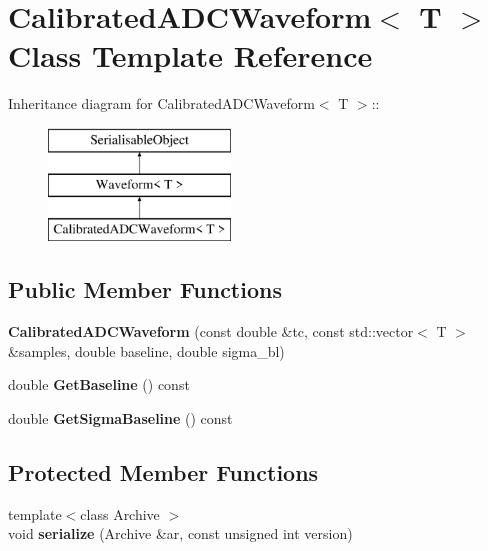 \hypertarget{classCalibratedADCWaveform}{
\section{CalibratedADCWaveform$<$ T $>$ Class Template Reference}
\label{classCalibratedADCWaveform}
}
Inheritance diagram for CalibratedADCWaveform$<$ T $>$::\begin{figure}[H]
\begin{center}
\leavevmode
\includegraphics[height=3cm]{classCalibratedADCWaveform}
\end{center}
\end{figure}
\subsection*{Public Member Functions}
\begin{DoxyCompactItemize}
\item 
\hypertarget{classCalibratedADCWaveform_ab8d6abbf935c75db5de184c5a3291ef6}{
{\bfseries CalibratedADCWaveform} (const double \&tc, const std::vector$<$ T $>$ \&samples, double baseline, double sigma\_\-bl)}
\label{classCalibratedADCWaveform_ab8d6abbf935c75db5de184c5a3291ef6}

\item 
\hypertarget{classCalibratedADCWaveform_ae22d006546a5666eafd89d361a470798}{
double {\bfseries GetBaseline} () const }
\label{classCalibratedADCWaveform_ae22d006546a5666eafd89d361a470798}

\item 
\hypertarget{classCalibratedADCWaveform_a5afc74fd628dd6d70d60378467092e9d}{
double {\bfseries GetSigmaBaseline} () const }
\label{classCalibratedADCWaveform_a5afc74fd628dd6d70d60378467092e9d}

\end{DoxyCompactItemize}
\subsection*{Protected Member Functions}
\begin{DoxyCompactItemize}
\item 
\hypertarget{classCalibratedADCWaveform_a79b70f364816b8e558ab18d279b6b806}{
{\footnotesize template$<$class Archive $>$ }\\void {\bfseries serialize} (Archive \&ar, const unsigned int version)}
\label{classCalibratedADCWaveform_a79b70f364816b8e558ab18d279b6b806}

\end{DoxyCompactItemize}
